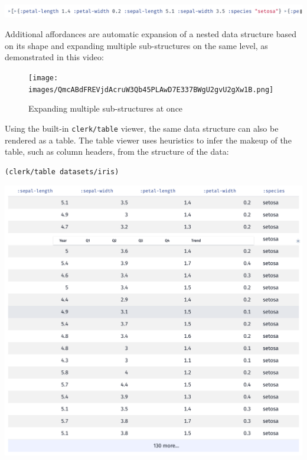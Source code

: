 \documentclass[sigconf,screen,pbalance=true]{acmart}
\newcommand{\passthrough}[1]{#1}
\begin{document}
\includegraphics{images/anon-expr-5dtc44qrw3zUvpTfiAXJDH7mtADdRT-result.png}

Additional affordances are automatic expansion of a nested data structure based on its shape and expanding multiple sub-structures on the same level, as demonstrated in this video:

\begin{figure}
\hypertarget{expanding-multiple-sub-structures-at-once}{%
\centering
\texttt{[image: images/QmcABdFREVjdAcruW3Qb45PLAwD7E337BWgU2gvU2gXw1B.png]}
\caption{Expanding multiple sub-structures at once}\label{expanding-multiple-sub-structures-at-once}
}
\end{figure}

Using the built-in \passthrough{\lstinline!clerk/table!} viewer, the same data structure can also be rendered as a table. The table viewer uses heuristics to infer the makeup of the table, such as column headers, from the structure of the data:

\begin{minipage}{\linewidth}
\begin{lstlisting}
(clerk/table datasets/iris)
\end{lstlisting}
\end{minipage}

\includegraphics{images/anon-expr-5dtuc4aWdsThsN1ZehoANzcdjAoyh5-result.png}
\end{document}
